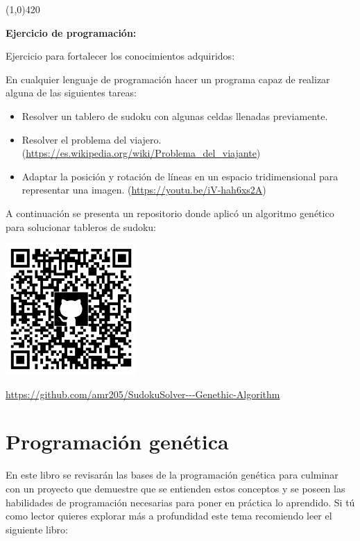 \documentclass[11pt,fleqn]{book} %
\begin{document}
\FloatBarrier

\begin{center}
\line(1,0){420}
\end{center}

\textbf{Ejercicio de programación:}

Ejercicio para fortalecer los conocimientos adquiridos:

En cualquier lenguaje de programación hacer un programa capaz de realizar alguna de las siguientes tareas:

\begin{itemize}
\item Resolver un tablero de sudoku con algunas celdas llenadas previamente.
\item Resolver el problema del viajero. 
	(\url{https://es.wikipedia.org/wiki/Problema_del_viajante})
\item Adaptar la posición y rotación de líneas en un espacio tridimensional para 	representar una imagen. (\url{https://youtu.be/iV-hah6xs2A})
\end{itemize}
A continuación se presenta un repositorio donde aplicó un algoritmo genético para solucionar tableros de sudoku:

\includegraphics[width=5cm]{Pictures/github/genetic.png}

\url{https://github.com/amr205/SudokuSolver---Genethic-Algorithm}

\section{Programación genética} 

En este libro se revisarán las bases de la programación genética para culminar con un proyecto que demuestre que se entienden estos conceptos y se poseen las habilidades de programación necesarias para poner en práctica lo aprendido. Si tú como lector quieres explorar más a profundidad este tema recomiendo leer el siguiente libro:
\end{document}
